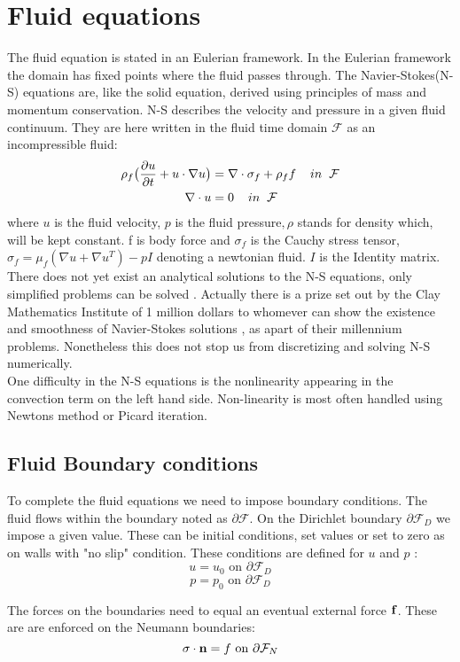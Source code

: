 
\section{Fluid equations}
The fluid equation is stated in an Eulerian framework. In the Eulerian framework the domain has fixed points where the fluid passes through. 
The Navier-Stokes(N-S) equations are, like the solid equation, derived using principles of mass and momentum conservation. N-S describes the velocity and pressure in a given fluid continuum. They are here written in the fluid time domain $\mathcal{F}$ as an incompressible fluid:
\begin{align}
\label{eq:NS}
\rho_f\big( \frac{\partial u}{\partial t} +  u \cdot \nabla u\big) &= \nabla \cdot \sigma_f + \rho_ff  \hspace{4mm} in \hspace{2mm} \mathcal{F}\\
\nabla \cdot u &= 0 \hspace{4mm} in \hspace{2mm} \mathcal{F}
\end{align}
where $u$ is the fluid velocity, $p$ is the fluid pressure$, \rho$ stands for density which, will be kept constant. f is body force and $\sigma_f$ is the Cauchy stress tensor, $ \sigma_f = \mu_f (\nabla u + \nabla u^T)  - pI$ denoting a newtonian fluid. $I$ is the Identity matrix. \\

There does not yet exist an analytical solutions to the N-S equations, only simplified problems can be solved \cite{White2000}. Actually there is a prize set out by the Clay Mathematics Institute of 1 million dollars to whomever can show the existence and smoothness of Navier-Stokes solutions \cite{Fefferman2000}, as apart of their millennium problems. 
Nonetheless this does not stop us from discretizing and solving N-S numerically. \\

One difficulty in the N-S equations is the nonlinearity appearing in the convection term on the left hand side. Non-linearity is most often handled using Newtons method or Picard iteration.

\subsection{Fluid Boundary conditions}
To complete the fluid equations we need to impose boundary conditions. The fluid flows within the boundary noted as $ \partial \mathcal{F}$. On the Dirichlet boundary $ \partial \mathcal{F}_D$ we impose a given value. These can be initial conditions, set values or set to zero as on walls with "no slip" condition. These conditions are defined for $u$ and $p$ :
$$  u = u_0 \text{   on   } \partial \mathcal{F}_D  $$
$$  p = p_0 \text{   on   } \partial \mathcal{F}_D  $$

The forces on the boundaries need to equal an eventual external force $ \bold{f}$. These are are enforced on the Neumann boundaries:
$$ \sigma \cdot \bold{n} = f \text{   on   } \partial \mathcal{F}_N    $$







